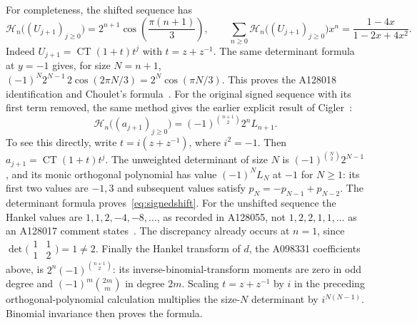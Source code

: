 \documentclass[11pt]{article}
\begin{document}
For completeness, the shifted sequence has
\begin{equation}\label{eq:shifted}
 \mathcal H_n\bigl((U_{j+1})_{j\geq0}\bigr)
 =2^{n+1}\cos\!\left(\frac{\pi(n+1)}3\right),\qquad
 \sum_{n\geq0}\mathcal H_n\bigl((U_{j+1})_{j\geq0}\bigr)x^n
 =\frac{1-4x}{1-2x+4x^2}.
\end{equation}
Indeed $U_{j+1}=\operatorname{CT}(1+t)t^j$ with $t=z+z^{-1}$.
The same determinant formula at $y=-1$ gives, for size $N=n+1$,
$(-1)^N2^{N-1}\,2\cos(2\pi N/3)=2^N\cos(\pi N/3)$.
This proves the A128018 identification and Choulet's formula~\cite{a128018}.
For the original signed sequence with its first term removed, the same
method gives the earlier explicit result of Cigler~\cite[Theorem~2.2,
equation~(2.7)]{cigler2018}:
\begin{equation}\label{eq:signedshift}
 \mathcal H_n\bigl((a_{j+1})_{j\geq0}\bigr)
 =(-1)^{\binom{n+1}2}2^nL_{n+1}.
\end{equation}
To see this directly, write $t=i(z+z^{-1})$, where $i^2=-1$.
Then $a_{j+1}=\operatorname{CT}(1+t)t^j$.
The unweighted determinant of size $N$ is
$(-1)^{\binom N2}2^{N-1}$, and its monic orthogonal polynomial has
value $(-1)^NL_N$ at $-1$ for $N\geq1$: its first two values are
$-1,3$ and subsequent values satisfy $p_N=-p_{N-1}+p_{N-2}$.
The determinant formula proves~\eqref{eq:signedshift}.
For the unshifted sequence the Hankel values are
$1,1,2,-4,-8,\ldots$, as recorded in A128055, not
$1,2,2,1,1,\ldots$ as an A128017 comment states~\cite{a128017}.
The discrepancy already occurs at $n=1$, since
$\det\bigl(\begin{smallmatrix}1&1\\1&2\end{smallmatrix}\bigr)=1\ne2$.
Finally the Hankel transform of $d$, the A098331 coefficients above, is
$2^n(-1)^{\binom{n+1}2}$: its inverse-binomial-transform moments are
zero in odd degree and $(-1)^m\binom{2m}m$ in degree $2m$.
Scaling $t=z+z^{-1}$ by $i$ in the preceding orthogonal-polynomial
calculation multiplies the size-$N$ determinant by $i^{N(N-1)}$.
Binomial invariance then proves the formula.
\end{document}
